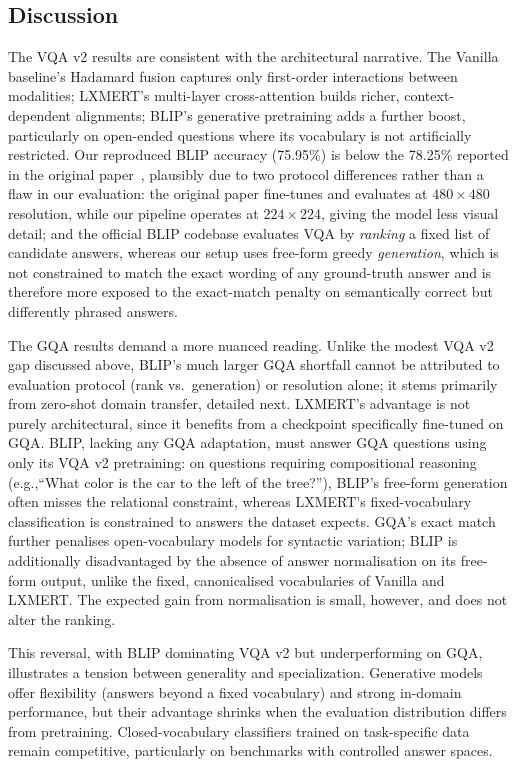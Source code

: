 \subsection{Discussion}

The VQA v2 results are consistent with the architectural narrative. The Vanilla baseline's Hadamard fusion captures only first-order interactions between modalities; LXMERT's multi-layer cross-attention builds richer, context-dependent alignments; BLIP's generative pretraining adds a further boost, particularly on open-ended questions where its vocabulary is not artificially restricted. Our reproduced BLIP accuracy (75.95\%) is below the 78.25\% reported in the original paper~\cite{li2022blip}, plausibly due to two protocol differences rather than a flaw in our evaluation: the original paper fine-tunes and evaluates at $480\times480$ resolution, while our pipeline operates at $224\times224$, giving the model less visual detail; and the official BLIP codebase evaluates VQA by \emph{ranking} a fixed list of candidate answers, whereas our setup uses free-form greedy \emph{generation}, which is not constrained to match the exact wording of any ground-truth answer and is therefore more exposed to the exact-match penalty on semantically correct but differently phrased answers.

The GQA results demand a more nuanced reading. Unlike the modest VQA v2 gap discussed above, BLIP's much larger GQA shortfall cannot be attributed to evaluation protocol (rank vs.\ generation) or resolution alone; it stems primarily from zero-shot domain transfer, detailed next. LXMERT's advantage is not purely architectural, since it benefits from a checkpoint specifically fine-tuned on GQA. BLIP, lacking any GQA adaptation, must answer GQA questions using only its VQA v2 pretraining: on questions requiring compositional reasoning (e.g.,``What color is the car to the left of the tree?''), BLIP's free-form generation often misses the relational constraint, whereas LXMERT's fixed-vocabulary classification is constrained to answers the dataset expects. GQA's exact match further penalises open-vocabulary models for syntactic variation; BLIP is additionally disadvantaged by the absence of answer normalisation on its free-form output, unlike the fixed, canonicalised vocabularies of Vanilla and LXMERT. The expected gain from normalisation is small, however, and does not alter the ranking.

This reversal, with BLIP dominating VQA v2 but underperforming on GQA, illustrates a tension between generality and specialization. Generative models offer flexibility (answers beyond a fixed vocabulary) and strong in-domain performance, but their advantage shrinks when the evaluation distribution differs from pretraining. Closed-vocabulary classifiers trained on task-specific data remain competitive, particularly on benchmarks with controlled answer spaces.

